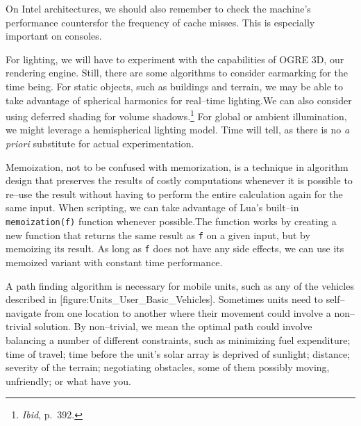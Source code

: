 On Intel architectures, we should also remember to check the machine's performance counters for the frequency of cache misses. This is especially important on consoles.

For lighting, we will have to experiment with the capabilities of OGRE 3D, our rendering engine. Still, there are some algorithms to consider earmarking for the time being. For static objects, such as buildings and terrain, we may be able to take advantage of spherical harmonics for real--time lighting. We can also consider using deferred shading for volume shadows.\footnote{{\it Ibid}, p.~392.} For global or ambient illumination, we might leverage a hemispherical lighting model. Time will tell, as there is no {\it a priori} substitute for actual experimentation.

Memoization, not to be confused with memorization, is a technique in algorithm design that preserves the results of costly computations whenever it is possible to re--use the result without having to perform the entire calculation again for the same input. When scripting, we can take advantage of Lua's built--in {\tt memoization(f)} function whenever possible. The function works by creating a new function that returns the same result as {\tt f} on a given input, but by memoizing its result. As long as {\tt f} does not have any side effects, we can use its memoized variant with constant time performance.

A path finding algorithm is necessary for mobile units, such as any of the vehicles described in [figure:Units_User_Basic_Vehicles]. Sometimes units need to self--navigate from one location to another where their movement could involve a non--trivial solution. By non--trivial, we mean the optimal path could involve balancing a number of different constraints, such as minimizing fuel expenditure; time of travel; time before the unit's solar array is deprived of sunlight; distance; severity of the terrain; negotiating obstacles, some of them possibly moving, unfriendly; or what have you.
\crlf

    {}

